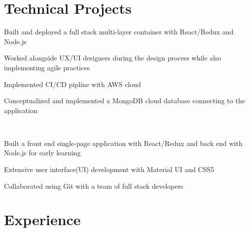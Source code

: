\documentclass[]{deedy-resume-openfont}
\begin{document}
\begin{minipage}[t]{4in} 


\section{Technical Projects}
\vspace{\topsep} %
\begin{tightemize}
\item Built and deployed a full stack multi-layer container with React/Redux and Node.js
\item Worked alongside UX/UI designers during the design process while also implementing agile practices
\item Implemented CI/CD pipline with AWS cloud
\item Conceptualized and implemented a MongoDB cloud database connecting to the application
\end{tightemize}
\sectionsep

 \\
\vspace{\topsep}
\begin{tightemize}
\item Built a front end single-page application with React/Redux and back end with Node.js for early learning \\
\item Extensive user interface(UI) development with Material UI and CSS5
\item Collaborated using Git with a team of full stack developers
\end{tightemize}
\sectionsep



\section{Experience}


\end{minipage}
\end{document}
